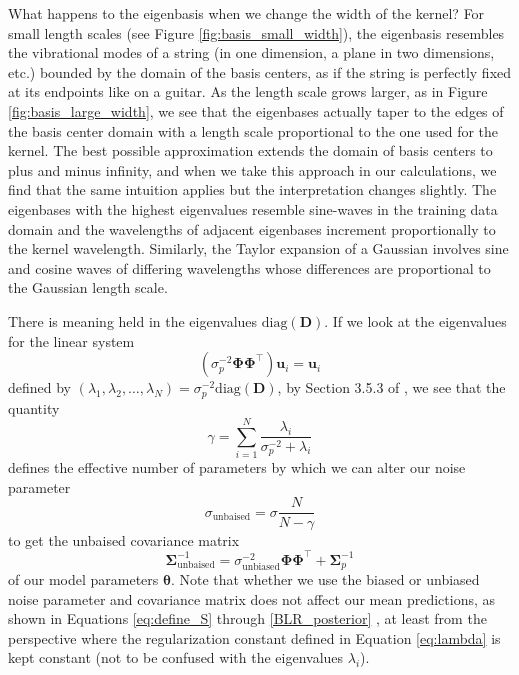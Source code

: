 \documentclass{article}
\begin{document}
What happens to the eigenbasis when we change the width of the kernel? For small length scales (see Figure \ref{fig:basis_small_width}), the eigenbasis resembles the vibrational modes of a string (in one dimension, a plane in two dimensions, etc.) bounded by the domain of the basis centers, as if the string is perfectly fixed at its endpoints like on a guitar. As the length scale grows larger, as in Figure \ref{fig:basis_large_width}, we see that the eigenbases actually taper to the edges of the basis center domain with a length scale proportional to the one used for the kernel. The best possible approximation extends the domain of basis centers to plus and minus infinity, and when we take this approach in our calculations, we find that the same intuition applies but the interpretation changes slightly. The eigenbases with the highest eigenvalues resemble sine-waves in the training data domain and the wavelengths of adjacent eigenbases increment proportionally to the kernel wavelength. Similarly, the Taylor expansion of a Gaussian involves sine and cosine waves of differing wavelengths whose differences are proportional to the Gaussian length scale.

There is meaning held in the eigenvalues $\text{diag}(\mathbf{D})$. If we look at the eigenvalues for the linear system \begin{equation}\left(\sigma_p^{-2}\boldsymbol{\Phi}\boldsymbol{\Phi}^\top\right)\mathbf{u}_i=\mathbf{u}_i\end{equation} defined by $(\lambda_1,\lambda_2,\dots,\lambda_N)=\sigma_p^{-2}\text{diag}(\mathbf{D})$, by Section 3.5.3 of \cite{bishop}, we see that the quantity
\begin{equation}
\gamma=\sum_{i=1}^{N}\frac{\lambda_i}{\sigma_p^{-2} + \lambda_i}
\end{equation} defines the effective number of parameters by which we can alter our noise parameter \begin{equation}\sigma_\text{unbaised}=\sigma\frac{N}{N-\gamma}\end{equation} to get the unbaised covariance matrix \begin{equation}\boldsymbol{\Sigma}_\text{unbaised}^{-1}=\sigma_\text{unbiased}^{-2}\boldsymbol{\Phi}\boldsymbol{\Phi}^\top+\boldsymbol{\Sigma}_p^{-1}\end{equation} of our model parameters $\boldsymbol{\theta}$. Note that whether we use the biased or unbiased noise parameter and covariance matrix does not affect our mean predictions, as shown in Equations \ref{eq:define_S} through \ref{BLR_posterior} , at least from the perspective where the regularization constant defined in Equation \ref{eq:lambda} is kept constant (not to be confused with the eigenvalues  $\lambda_i$).
\end{document}
